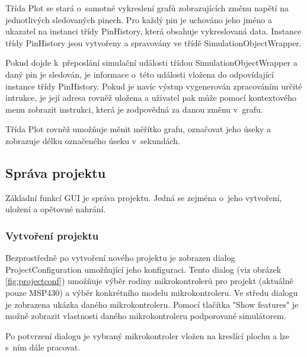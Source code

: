 Třída Plot se stará o~samotné vykreslení grafů zobrazujících změnu napětí na jednotlivých sledovaných pinech. Pro každý pin je uchováno jeho jméno a ukazatel na instanci třídy PinHistory, která obsahuje vykreslovaná data. Instance třídy PinHistory jsou vytvořeny a spravovány ve třídě SimulationObjectWrapper.

Pokud dojde k~přeposlání simulační události třídou SimulationObjectWrapper a daný pin je sledován, je informace o~této události vložena do odpovídající instance třídy PinHistory. Pokud je navíc výstup vygenerován zpracováním určité intrukce, je její adresa rovněž uložena a uživatel pak může pomocí kontextového menu zobrazit instrukci, která je zodpovědná za danou změnu v~grafu.

Třída Plot rovněž umožňuje měnit měřítko grafu, označovat jeho úseky a zobrazuje délku označeného úseku v~sekundách.

\subsection{Správa projektu}

Základní funkcí GUI je správa projektu. Jedná se zejména o~jeho vytvoření, uložení a opětovné nahrání.

\subsubsection{Vytvoření projektu}

Bezprostředně po vytvoření nového projektu je zobrazen dialog ProjectConfiguration umožňující jeho konfiguraci. Tento dialog (viz obrázek \ref{fig:projectconf}) umožňuje výběr rodiny mikrokontrolerů pro projekt (aktuálně pouze MSP430) a výběr konkrétního modelu mikrokontroleru. Ve středu dialogu je zobrazena ukázka daného mikrokontroleru. Pomocí tlačítka "Show features" je možné zobrazit vlastnosti daného mikrokontroleru podporované simulátorem.

Po potvrzení dialogu je vybraný mikrokontroler vložen na kreslící plochu a lze s~ním dále pracovat.

